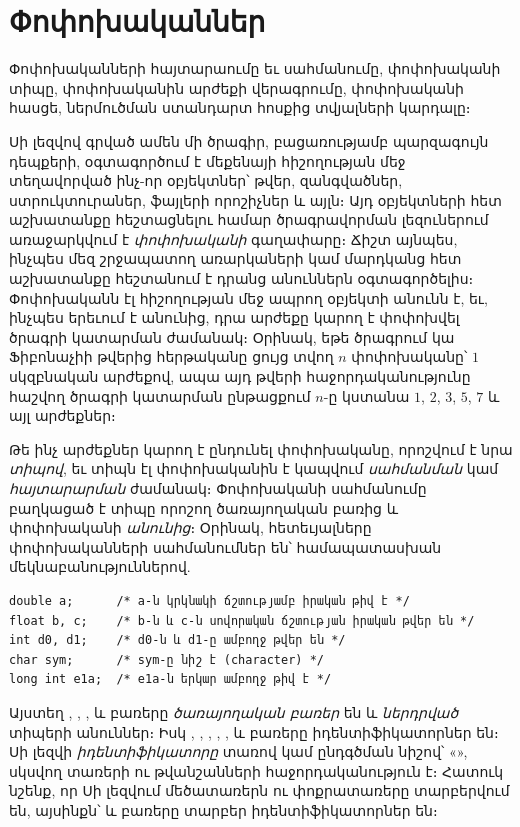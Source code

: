 \chapter{Փոփոխականներ}
\label{cha:variables}

\begin{epigraph}
Փոփոխականների հայտարաումը եւ սահմանումը, փոփոխականի
տիպը, փոփոխականին արժեքի վերագրումը, փոփոխականի հասցե,
ներմուծման ստանդարտ հոսքից տվյալների կարդալը։
\end{epigraph}

Սի լեզվով գրված ամեն մի ծրագիր, բացառությամբ պարզագույն դեպքերի,
օգտագործում է մեքենայի հիշողության մեջ տեղավորված ինչ-որ օբյեկտներ՝
թվեր, զանգվածներ, ստրուկտուրաներ, ֆայլերի որոշիչներ և այլն։ Այդ 
օբյեկտների հետ աշխատանքը հեշտացնելու համար ծրագրավորման լեզուներում
առաջարկվում է \emph{փոփոխականի} գաղափարը։ Ճիշտ
այնպես, ինչպես մեզ շրջապատող առարկաների կամ մարդկանց հետ աշխատանքը 
հեշտանում է դրանց անուններն օգտագործելիս։ Փոփոխականն էլ հիշողության
մեջ ապրող օբյեկտի անունն է, եւ, ինչպես երեւում է անունից, դրա
արժեքը կարող է փոփոխվել ծրագրի կատարման ժամանակ։ Օրինակ, եթե 
ծրագրում կա Ֆիբոնաչիի թվերից հերթականը ցույց տվող \(n\) փոփոխականը՝ 
\(1\) սկզբնական արժեքով, ապա այդ թվերի հաջորդականությունը հաշվող
ծրագրի կատարման ընթացքում \(n\)-ը կստանա \(1\), \(2\), \(3\), 
\(5\), \(7\) և այլ արժեքներ։

Թե ինչ արժեքներ կարող է ընդունել փոփոխականը, որոշվում է նրա 
\emph{տիպով}, եւ տիպն էլ փոփոխականին է 
կապվում \emph{սահմանման} կամ 
\emph{հայտարարման} ժամանակ։ Փոփոխականի սահմանումը բաղկացած է 
տիպը որոշող ծառայողական բառից և փոփոխականի \emph{անունից}։
 Օրինակ, հետեւյալները փոփոխականների
սահմանումներ են՝ համապատասխան մեկնաբանություններով.

\begin{Verbatim}
double a;      /* a-ն կրկնակի ճշտությամբ իրական թիվ է */
float b, c;    /* b-ն և c-ն սովորական ճշտության իրական թվեր են */
int d0, d1;    /* d0-ն և d1-ը ամբողջ թվեր են */
char sym;      /* sym-ը նիշ է (character) */ 
long int e1a;  /* e1a-ն երկար ամբողջ թիվ է */
\end{Verbatim}

Այստեղ , , 
,  և 
 բառերը \emph{ծառայողական բառեր} են և \emph{ներդրված}
տիպերի անուններ։ Իսկ , , , ,
,  և  բառերը իդենտիֆիկատորներ են։
Սի լեզվի \emph{իդենտիֆիկատորը} տառով կամ ընդգծման նիշով՝
«\code{\_}», սկսվող տառերի ու թվանշանների հաջորդականություն է։
Հատուկ նշենք, որ Սի լեզվում մեծատառերն ու փոքրատառերը տարբերվում
են, այսինքն՝  և  բառերը տարբեր
իդենտիֆիկատորներ են։

